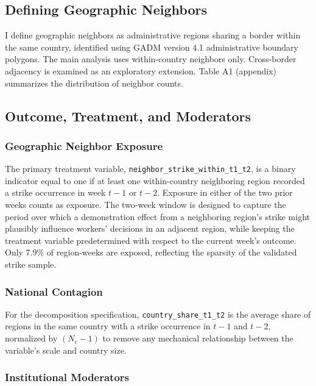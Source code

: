 \documentclass[
  11pt,
]{article}
\begin{document}
\subsection{Defining Geographic
Neighbors}\label{defining-geographic-neighbors}

I define geographic neighbors as administrative regions sharing a border
within the same country, identified using GADM version 4.1
administrative boundary polygons. The main analysis uses within-country
neighbors only. Cross-border adjacency is examined as an exploratory
extension. Table A1 (appendix) summarizes the distribution of neighbor
counts.

\subsection{Outcome, Treatment, and
Moderators}\label{outcome-treatment-and-moderators}

\subsubsection{Geographic Neighbor
Exposure}\label{geographic-neighbor-exposure}

The primary treatment variable,
\texttt{neighbor\_strike\_within\_t1\_t2}, is a binary indicator equal
to one if at least one within-country neighboring region recorded a
strike occurrence in week \(t-1\) or \(t-2\). Exposure in either of the
two prior weeks counts as exposure. The two-week window is designed to
capture the period over which a demonstration effect from a neighboring
region's strike might plausibly influence workers' decisions in an
adjacent region, while keeping the treatment variable predetermined with
respect to the current week's outcome. Only 7.9\% of region-weeks are
exposed, reflecting the sparsity of the validated strike sample.

\subsubsection{National Contagion}\label{national-contagion}

For the decomposition specification, \texttt{country\_share\_t1\_t2} is
the average share of regions in the same country with a strike
occurrence in \(t-1\) and \(t-2\), normalized by \((N_c - 1)\) to remove
any mechanical relationship between the variable's scale and country
size.

\subsubsection{Institutional Moderators}\label{institutional-moderators}
\end{document}
